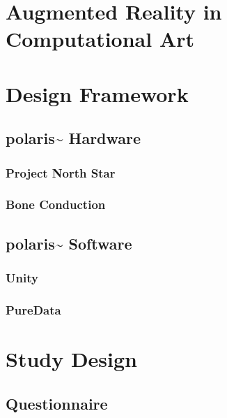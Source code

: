 \section{Augmented Reality in Computational Art}\label{sec: polaris-intro}



\section{Design Framework}\label{sec: polaris-framework}
\subsection{polaris\textasciitilde{} Hardware}\label{sec: polaris-framework-hardware}
\subsubsection{Project North Star}\label{sec: polaris-framework-hardware-pns}
\subsubsection{Bone Conduction}\label{sec: polaris-framework-hardware-bc}

\subsection{polaris\textasciitilde{} Software}\label{sec: polaris-framework-software}
\subsubsection{Unity}\label{sec: polaris-framework-software-unity}
\subsubsection{PureData}\label{sec: polaris-framework-software-puredata}



\section{Study Design}\label{sec: polaris-study}
\subsection{Questionnaire}\label{sec: polaris-study-questionnaire}

